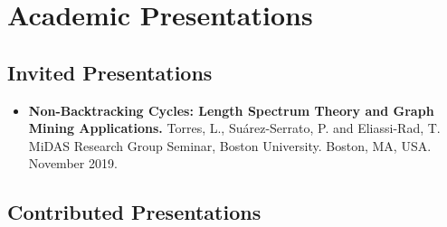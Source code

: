 \documentclass[12pt,]{scrartcl}
\begin{document}
\section{Academic Presentations}\label{presentations}

\subsection{Invited Presentations}\label{invited-presentations}

\begin{itemize}
\leftskip-0.25in %

\item \textbf{Non-Backtracking Cycles: Length Spectrum Theory and Graph Mining Applications.} Torres, L., Su\'arez-Serrato, P. and Eliassi-Rad, T. MiDAS Research Group Seminar, Boston University. Boston, MA, USA. November 2019.

\end{itemize}

\subsection{Contributed Presentations}\label{contributed-presentations}
\end{document}
